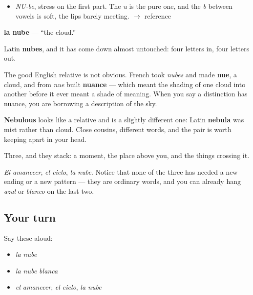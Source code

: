 \begin{sounds}
\begin{itemize}
\raggedright
  \item \emph{NU-be}, stress on the first part. The \emph{u} is the pure one, and the \emph{b} between vowels is soft, the lips barely meeting. $\to$ reference
\end{itemize}
\end{sounds}

\begin{cousinweb}
\textbf{la nube} — \textquotedblleft{}the cloud.\textquotedblright{}

Latin \textbf{nubes}, and it has come down almost untouched: four letters in, four letters out.

The good English relative is not obvious. French took \emph{nubes} and made \textbf{nue}, a cloud, and from \emph{nue} built \textbf{nuance} — which meant the shading of one cloud into another before it ever meant a shade of meaning. When you say a distinction has nuance, you are borrowing a description of the sky.

\textbf{Nebulous} looks like a relative and is a slightly different one: Latin \textbf{nebula} was mist rather than cloud. Close cousins, different words, and the pair is worth keeping apart in your head.
\end{cousinweb}

\begin{grammarlens}[title={What you've built}]
Three, and they stack: a moment, the place above you, and the things crossing it.

\emph{El amanecer}, \emph{el cielo}, \emph{la nube}. Notice that none of the three has needed a new ending or a new pattern — they are ordinary words, and you can already hang \emph{azul} or \emph{blanco} on the last two.
\end{grammarlens}

\subsection*{Your turn}
Say these aloud:

\begin{itemize}
\raggedright
  \item \emph{la nube}
  \item \emph{la nube blanca}
  \item \emph{el amanecer}, \emph{el cielo}, \emph{la nube}
\end{itemize}

